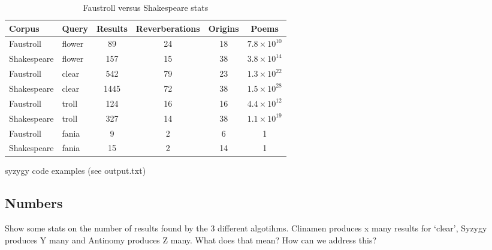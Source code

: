 \begin{table}
  \centering
  \begin{tabu}{llcccc}
  \toprule
  \textbf{Corpus} & \textbf{Query} & \textbf{Results} & \textbf{Reverberations} & \textbf{Origins} & \textbf{Poems}\\
  \midrule
  Faustroll & flower & 89 & 24 & 18 & $7.8 \times 10^{10}$\\
  Shakespeare & flower & 157 & 15 & 38 & $3.8 \times 10^{14}$\\
  Faustroll & clear & 542 & 79 & 23 & $1.3 \times 10^{22}$\\
  Shakespeare & clear & 1445 & 72 & 38 & $1.5 \times 10^{28}$\\
  Faustroll & troll & 124 & 16 & 16 & $4.4 \times 10^{12}$\\
  Shakespeare & troll & 327 & 14 & 38 & $1.1 \times 10^{19}$\\
  Faustroll & fania & 9 & 2 & 6 & 1\\
  Shakespeare & fania & 15 & 2 & 14 & 1\\
  \bottomrule
  \end{tabu}
\caption[Faustroll vs Shakespeare stats]{Faustroll versus Shakespeare stats}
\label{tab:faustshake}
\end{table}

syzygy code examples (see output.txt)


\subsection{Numbers}

Show some stats on the number of results found by the 3 different algotihms.
Clinamen produces x many results for `clear', Syzygy produces Y many and Antinomy produces Z many.
What does that mean? How can we address this?

